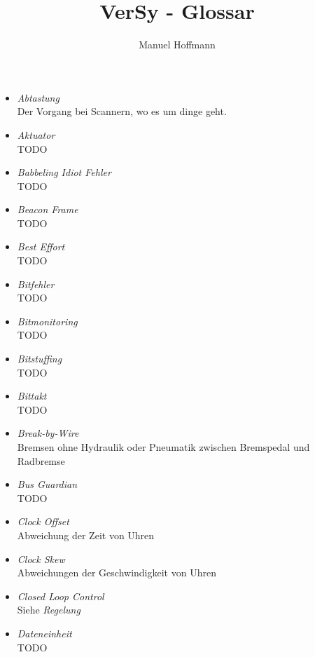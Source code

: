 \documentclass{article}
\title{VerSy - Glossar}
\author{Manuel Hoffmann}
\begin{document}
\begin{itemize}
	\item \emph{Abtastung}\\
		Der Vorgang bei Scannern, wo es um dinge geht.

	\item \emph{Aktuator}\\
		TODO

	\item \emph{Babbeling Idiot Fehler}\\
		TODO

	\item \emph{Beacon Frame}\\
		TODO

	\item \emph{Best Effort}\\
		TODO

	\item \emph{Bitfehler}\\
		TODO

	\item \emph{Bitmonitoring}\\
		TODO

	\item \emph{Bitstuffing}\\
		TODO

	\item \emph{Bittakt}\\
		TODO

	\item \emph{Break-by-Wire}\\
		Bremsen ohne Hydraulik oder Pneumatik zwischen Bremspedal und Radbremse

	\item \emph{Bus Guardian}\\
		TODO

	\item \emph{Clock Offset}\\
		Abweichung der Zeit von Uhren

	\item \emph{Clock Skew}\\
		Abweichungen der Geschwindigkeit von Uhren

	\item \emph{Closed Loop Control}\\
		Siehe \emph{Regelung}

	\item \emph{Dateneinheit}\\
		TODO
	

\end{itemize}
\end{document}
